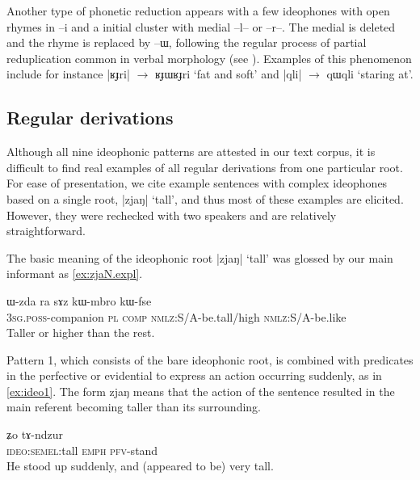 \documentclass[oldfontcommands,oneside,a4paper,11pt]{article}
\newcommand{\ipa}[1]{{\phon \mbox{#1}}} %
\begin{document}
Another type of phonetic reduction appears with a few ideophones with open rhymes in \ipa{--i} and a initial cluster with medial \ipa{--l--} or \ipa{--r--}. The medial is deleted and the rhyme is replaced by \ipa{--ɯ}, following the regular process of partial reduplication common in verbal morphology (see \citealt[25-60]{jacques04these}). Examples of this phenomenon include for instance |\ipa{ʁɟri}| $\rightarrow$ \ipa{ʁɟɯʁɟri} `fat and soft' and  |\ipa{qli}| $\rightarrow$ \ipa{qɯqli} `staring at'.


\subsection{Regular derivations} \label{sec:ideo.regular}
 Although all nine ideophonic patterns are attested in our text corpus, it is difficult to find real examples of all regular derivations from one particular root. For ease of presentation, we cite example sentences with complex ideophones based on a single root, |\ipa{zjaŋ}|  `tall', and thus most of these examples are elicited. However, they were rechecked with two speakers and are relatively straightforward.


The basic meaning of the ideophonic root |\ipa{zjaŋ}|  `tall' was glossed by our main informant as \ref{ex:zjaN.expl}.
\begin{exe} 
\ex \label{ex:zjaN.expl}
\gll 
\ipa{ɯ-zda}  	\ipa{ra}  	\ipa{sɤz}  	\ipa{kɯ-mbro}  	\ipa{kɯ-fse}  \\
\textsc{3sg.poss}-companion \textsc{pl} \textsc{comp} \textsc{nmlz}:S/A-be.tall/high \textsc{nmlz}:S/A-be.like \\
\glt Taller or higher than the rest. 
\end{exe}
 


Pattern 1, which consists of the bare ideophonic root, is combined with predicates in the perfective or evidential to express an action occurring suddenly, as in \ref{ex:ideo1}. The form \ipa{zjaŋ} means that the action of the sentence resulted in the main referent becoming taller than its surrounding.

\begin{exe} 
\ex \label{ex:ideo1}
\gll \ipa{\textbf{zjaŋ}} \ipa{ʑo} 	\ipa{tɤ-ndzur}  \\
\textsc{ideo:semel}:tall \textsc{emph} \textsc{pfv}-stand \\
\glt He stood up suddenly, and (appeared to be) very tall.
\end{exe}
 
\end{document}
